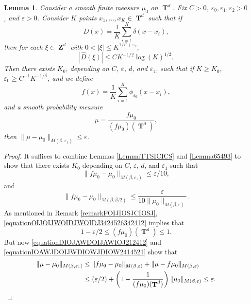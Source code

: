 \documentclass[12pt,reqno]{article}
\numberwithin{equation}{section}
\DeclareMathOperator{\ZZ}{\mathbf{Z}}
\DeclareMathOperator{\TT}{\mathbf{T}}
\newtheorem{lemma}{Lemma}
\begin{document}
\begin{lemma} \label{lemmaIOJDD23124}
    Consider a smooth finite measure $\mu_0$ on $\TT^d$. Fix $C > 0$, $\varepsilon_0, \varepsilon_1, \varepsilon_2 > 0$, and $\varepsilon > 0$. Consider $K$ points $x_1, \dots, x_K \in \TT^d$ such that if
    \[ D(x) = \frac{1}{K} \sum_{i = 1}^K \delta(x - x_i), \]
    then for each $\xi \in \ZZ^d$ with $0 < |\xi| \leq K^{1/\beta + \varepsilon_2}$,
    \begin{equation} \label{equationFFOSOXPFFGHI}
        |\widehat{D}(\xi)| \leq C K^{-1/2} \log(K)^{1/2}.
    \end{equation}
    Then there exists $K_0$, depending on $C$, $\varepsilon$, $d$, and $\varepsilon_1$, such that if $K \geq K_0$, $\varepsilon_0 \geq C^{-1} K^{-1/\beta}$, and we define
    \[ f(x) = \frac{1}{K} \sum_{i = 1}^K \phi_{\varepsilon_0}(x - x_i), \]
    and a smooth probability measure
    \[ \mu = \frac{f \mu_0}{(f \mu_0)(\TT^d)}, \]
    then $\| \mu - \mu_0 \|_{M(\beta,\varepsilon_1)} \leq \varepsilon$.
\end{lemma}
\begin{proof}
    It suffices to combine Lemmas \ref{LemmaTTSICICS} and \ref{Lemma65493} to show that there exists $K_0$ depending on $C$, $\varepsilon$, $d$, and $\varepsilon_1$ such that
    \begin{equation} \label{equationDIOJAWDOIJAWIOJ212412}
        \| f \mu_0 - \mu_0 \|_{M(\beta,\varepsilon_1)} \leq \varepsilon/10,
    \end{equation}
    and
    \begin{equation} \label{equationOIJOIJWOIDJWOIDJ3424526342412}
        \| f \mu_0 - \mu_0 \|_{M(\beta,\beta/2)} \leq \frac{\varepsilon}{10 \| \mu_0 \|_{M(\beta,\varepsilon)}}.
    \end{equation}
    As mentioned in Remark \ref{remarkFOIJIOSJCIOSJ}, \eqref{equationOIJOIJWOIDJWOIDJ3424526342412} implies that
    \begin{equation} \label{equationIOAWJDOIJWDIOWJDIOW2414521}
        1 - \varepsilon/2 \leq (f\mu_0)(\TT^d) \leq 1.
    \end{equation}
    But now \eqref{equationDIOJAWDOIJAWIOJ212412} and \eqref{equationIOAWJDOIJWDIOWJDIOW2414521} show that
    \begin{align*}
        \| \mu - \mu_0 \|_{M(\beta,\varepsilon_1)} &\leq \| f \mu_0 - \mu_0 \|_{M(\beta,\varepsilon)} + \| \mu - f \mu_0 \|_{M(\beta,\varepsilon)}\\
        &\leq (\varepsilon/2) + \left( 1 - \frac{1}{(f \mu_0)(\TT^d)} \right) \| \mu_0 \|_{M(\beta,\varepsilon)} \leq \varepsilon. \qedhere
    \end{align*}
\end{proof}
\end{document}
